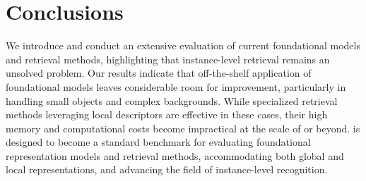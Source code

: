 \section{Conclusions}
We introduce \ours and conduct an extensive evaluation of current foundational models and retrieval methods, highlighting that instance-level retrieval remains an unsolved problem. 
Our results indicate that off-the-shelf application of foundational models leaves considerable room for improvement, particularly in handling small objects and complex backgrounds. 
While specialized retrieval methods leveraging local descriptors are effective in these cases, their high memory and computational costs become impractical at the scale of \ours or beyond. 
\ours is designed to become a standard benchmark for evaluating foundational representation models and retrieval methods, accommodating both global and local representations, and advancing the field of instance-level recognition.
